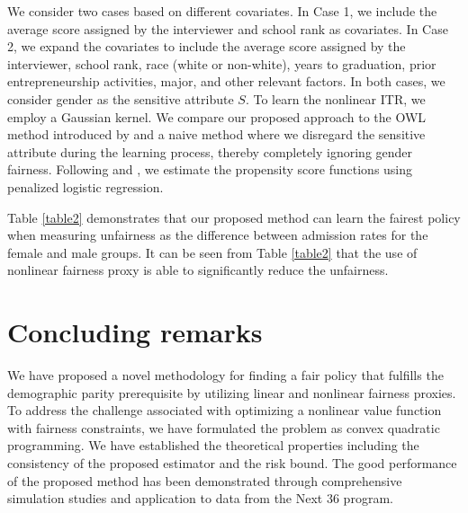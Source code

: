 \documentclass[12pt]{article}
\theoremstyle{plain}
\theoremstyle{definition}
\theoremstyle{remark}
\begin{document}
We consider two cases based on different covariates. In Case 1, we include the average score assigned by the interviewer and school rank as covariates. In Case 2, we expand the covariates to include the average score assigned by the interviewer, school rank, race (white or non-white), years to graduation, prior entrepreneurship activities, major, and other relevant factors. In both cases, we consider gender as the sensitive attribute $S$. To learn the nonlinear ITR, we employ a Gaussian kernel. We compare our proposed approach to the OWL method introduced by \cite{zhao2012estimating} and a naive method where we disregard the sensitive attribute during the learning process, thereby completely ignoring gender fairness. Following \cite{lyons2017impact} and \cite{viviano2023fair}, we estimate the propensity score functions using penalized logistic regression.

Table \ref{table2} demonstrates that our proposed method can learn the fairest policy when measuring unfairness as the difference between admission rates for the female and male groups.
It can be seen from Table \ref{table2} that the use of nonlinear fairness proxy is able to significantly reduce the unfairness.







\section{Concluding remarks}
We have proposed a novel methodology for finding a fair policy that fulfills the demographic parity prerequisite by utilizing linear and nonlinear fairness proxies. To address the challenge associated with optimizing a nonlinear value function with fairness constraints, we have formulated the problem as convex quadratic programming. We have established the theoretical properties including the consistency  of the proposed estimator and the risk bound. The good performance of the proposed method has been demonstrated through comprehensive simulation studies and application to data from the Next 36 program.
\end{document}
